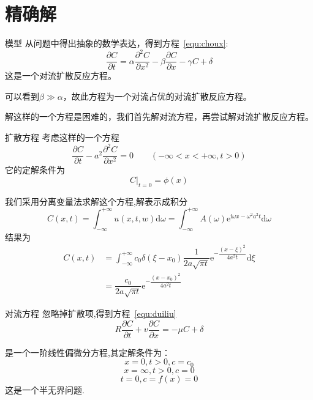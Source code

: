 \documentclass[xcolor=svgnames]{beamer} %
\newcommand{\dif}{\mathrm{d}}
\newcommand*{\me}{\ensuremath{\mathrm{e}}}    %
\newcommand*{\mi}{\ensuremath{\mathrm{i}}}        %
\begin{document}
\section{精确解}
\begin{frame}{模型}
从问题中得出抽象的数学表达，得到方程~\ref{equ:choux}:
\begin{equation}\label{equ:choux}
	\dfrac{\partial C}{\partial t}= \alpha\dfrac{\partial^2 C}{\partial x^2}-\beta\dfrac{\partial C}{\partial x}-\gamma C + \delta
\end{equation}
这是一个对流扩散反应方程。\par
可以看到$\beta\gg\alpha$，故此方程为一个对流占优的对流扩散反应方程。\par
解这样的一个方程是困难的，我们首先解对流方程，再尝试解对流扩散反应方程。
\end{frame}
\begin{frame}{扩散方程}
 考虑这样的一个方程
\begin{equation}
 \dfrac{\partial C}{\partial t}-a^2\dfrac{\partial^2 C}{\partial x^2}=0\qquad(-\infty < x < +\infty,t>0)
\end{equation}
它的定解条件为
\begin{equation}
 \left.C\right|_{t=0}=\phi(x)
\end{equation}
\end{frame}
\begin{frame}
我们采用分离变量法求解这个方程,解表示成积分
\begin{equation}\label{eq:cp3_kuosan_jfj}
 C(x,t)=\int_{-\infty}^{+\infty}u(x,t,w)\dif\omega 
 = \int_{-\infty}^{+\infty}A(\omega)\me^{\mi\omega x-\omega^2 a^2 t}\dif\omega
\end{equation}
结果为
\begin{equation}
 \begin{split}
  C(x,t)&=\int_{-\infty}^{+\infty}c_0\delta(\xi-x_0)\dfrac{1}{2a\sqrt{\pi t}}\me^{-\dfrac{(x-\xi)^2}{4a^2t}}\dif\xi \\
        &=\dfrac{c_0}{2a\sqrt{\pi t}}\me^{-\dfrac{(x-x_0)^2}{4a^2t}}
 \end{split}
\end{equation}
\end{frame}
\begin{frame}{对流方程}
忽略掉扩散项,得到方程~\eqref{equ:duiliu}
\begin{equation}\label{equ:duiliu}
R\dfrac{\partial C}{\partial t}+v\dfrac{\partial C}{\partial x}= -\mu C + \delta
\end{equation}\par
是一个一阶线性偏微分方程,其定解条件为：
\begin{equation}\label{equ:duiliu_bj}
x=0,t>0,c=c_0
\end{equation}
\begin{equation}
x=\infty,t>0,c=0
\end{equation}
\begin{equation}\label{equ:duiliu_init}
t=0,c=f(x)=0
\end{equation}
这是一个半无界问题.\par
\end{frame}
\end{document}
